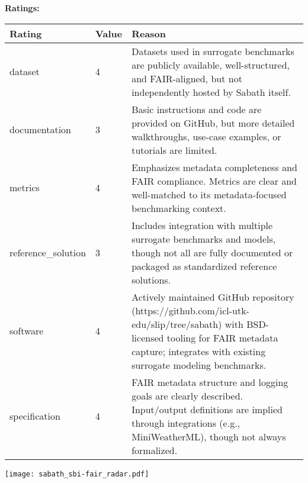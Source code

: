 {{{\bf Ratings:} ~ \\

\begin{tabular}{p{} p{} p{}}
\hline
Rating & Value & Reason \\
\hline
dataset & 4 & Datasets used in surrogate benchmarks are publicly available, well-structured, and
FAIR-aligned, but not independently hosted by Sabath itself.
 \\
documentation & 3 & Basic instructions and code are provided on GitHub, but more detailed walkthroughs,
use-case examples, or tutorials are limited.
 \\
metrics & 4 & Emphasizes metadata completeness and FAIR compliance. Metrics are clear and well-matched
to its metadata-focused benchmarking context.
 \\
reference\_solution & 3 & Includes integration with multiple surrogate benchmarks and models, though not all are
fully documented or packaged as standardized reference solutions.
 \\
software & 4 & Actively maintained GitHub repository (https://github.com/icl-utk-edu/slip/tree/sabath)
with BSD-licensed tooling for FAIR metadata capture; integrates with existing surrogate
modeling benchmarks.
 \\
specification & 4 & FAIR metadata structure and logging goals are clearly described. Input/output definitions
are implied through integrations (e.g., MiniWeatherML), though not always formalized.
 \\
\hline
\end{tabular}

\texttt{[image: sabath\_sbi-fair\_radar.pdf]}
}}
\clearpage